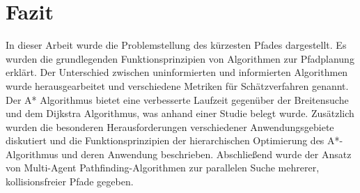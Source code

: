 \chapter{Fazit}

In dieser Arbeit wurde die Problemstellung des kürzesten Pfades dargestellt. Es wurden die grundlegenden Funktionsprinzipien von Algorithmen zur Pfadplanung erklärt. Der Unterschied zwischen uninformierten und informierten Algorithmen wurde herausgearbeitet und verschiedene Metriken für Schätzverfahren genannt. Der A* Algorithmus bietet eine verbesserte Laufzeit gegenüber der Breitensuche und dem Dijkstra Algorithmus, was anhand einer Studie belegt wurde. Zusätzlich wurden die besonderen Herausforderungen verschiedener Anwendungsgebiete diskutiert und die Funktionsprinzipien der hierarchischen Optimierung des A*-Algorithmus und deren Anwendung beschrieben. Abschließend wurde der Ansatz von Multi-Agent Pathfinding-Algorithmen zur parallelen Suche mehrerer, kollisionsfreier Pfade gegeben.
